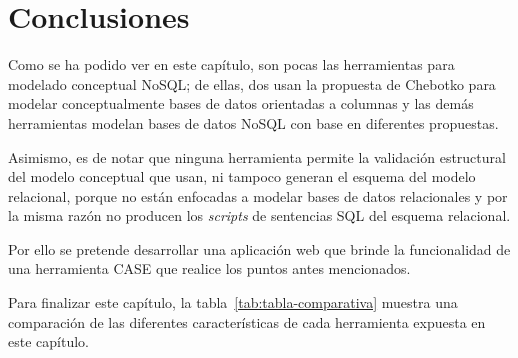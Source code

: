 \section{Conclusiones}

Como se ha podido ver en este capítulo, son pocas las herramientas para modelado conceptual NoSQL; de ellas, dos usan la propuesta de Chebotko para modelar conceptualmente bases de datos orientadas a columnas y las demás herramientas modelan bases de datos NoSQL con base en diferentes propuestas.


Asimismo, es de notar que ninguna herramienta permite la validación estructural del modelo conceptual que usan, ni tampoco generan el esquema del modelo relacional, porque no están enfocadas a modelar bases de datos relacionales y por la misma razón no producen los \textit{scripts} de sentencias SQL del esquema relacional.


Por ello se pretende desarrollar una aplicación web que brinde la funcionalidad de una herramienta CASE que realice los puntos antes mencionados.


Para finalizar este capítulo, la tabla~\ref{tab:tabla-comparativa} muestra una comparación de las diferentes características de cada herramienta expuesta en este capítulo.

